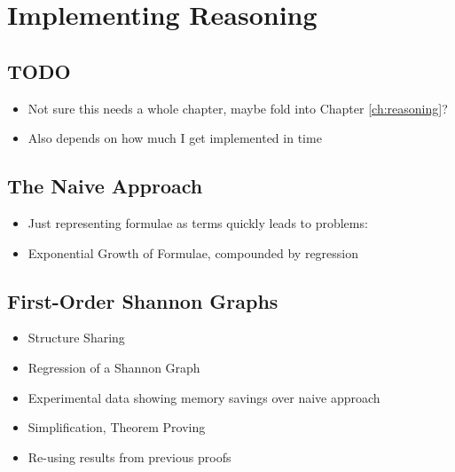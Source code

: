 \chapter{Implementing Reasoning}\label{ch:implementation}

\section{TODO}
\begin{itemize}
\item Not sure this needs a whole chapter, maybe fold into Chapter \ref{ch:reasoning}?
\item Also depends on how much I get implemented in time
\end{itemize}

\section{The Naive Approach}

\begin{itemize}
\item Just representing formulae as terms quickly leads to problems:
\item Exponential Growth of Formulae, compounded by regression
\end{itemize}

\section{First-Order Shannon Graphs}

\begin{itemize}
\item Structure Sharing
\item Regression of a Shannon Graph
\item Experimental data showing memory savings over naive approach
\item Simplification, Theorem Proving
\item Re-using results from previous proofs
\end{itemize}

